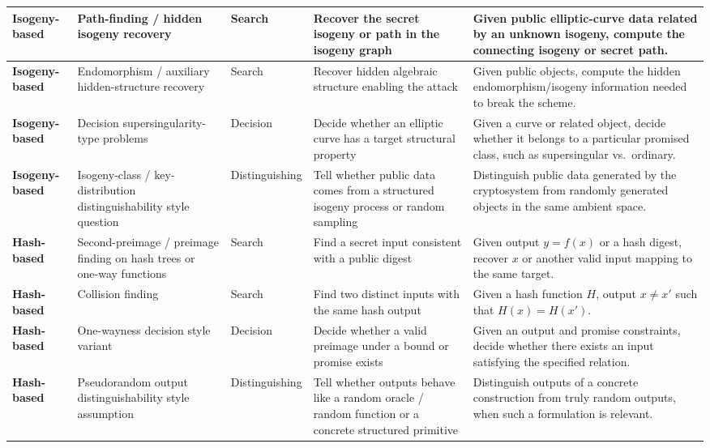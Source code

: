 \documentclass[11pt]{article}
\begin{document}
\begin{center}
\begin{tabular}{|p{1.9cm}|p{2.9cm}|p{3.3cm}|p{4.4cm}|p{4.8cm}|}
			\textbf{Isogeny-based} 
			& Path-finding / hidden isogeny recovery 
			& Search 
			& Recover the secret isogeny or path in the isogeny graph 
			& Given public elliptic-curve data related by an unknown isogeny, compute the connecting isogeny or secret path. \\
			\hline
			
			\textbf{Isogeny-based} 
			& Endomorphism / auxiliary hidden-structure recovery 
			& Search 
			& Recover hidden algebraic structure enabling the attack 
			& Given public objects, compute the hidden endomorphism/isogeny information needed to break the scheme. \\
			\hline
			
			\textbf{Isogeny-based} 
			& Decision supersingularity-type problems 
			& Decision 
			& Decide whether an elliptic curve has a target structural property 
			& Given a curve or related object, decide whether it belongs to a particular promised class, such as supersingular vs.\ ordinary. \\
			\hline
			
			\textbf{Isogeny-based} 
			& Isogeny-class / key-distribution distinguishability style question 
			& Distinguishing 
			& Tell whether public data comes from a structured isogeny process or random sampling 
			& Distinguish public data generated by the cryptosystem from randomly generated objects in the same ambient space. \\
			\hline
			
			\textbf{Hash-based} 
			& Second-preimage / preimage finding on hash trees or one-way functions 
			& Search 
			& Find a secret input consistent with a public digest 
			& Given output $y=f(x)$ or a hash digest, recover $x$ or another valid input mapping to the same target. \\
			\hline
			
			\textbf{Hash-based} 
			& Collision finding 
			& Search 
			& Find two distinct inputs with the same hash output 
			& Given a hash function $H$, output $x \neq x'$ such that $H(x)=H(x')$. \\
			\hline
			
			\textbf{Hash-based} 
			& One-wayness decision style variant 
			& Decision 
			& Decide whether a valid preimage under a bound or promise exists 
			& Given an output and promise constraints, decide whether there exists an input satisfying the specified relation. \\
			\hline
			
			\textbf{Hash-based} 
			& Pseudorandom output distinguishability style assumption 
			& Distinguishing 
			& Tell whether outputs behave like a random oracle / random function or a concrete structured primitive 
			& Distinguish outputs of a concrete construction from truly random outputs, when such a formulation is relevant. \\
			\hline
			
		\end{tabular}
	\end{center}
	\normalsize
	
\end{document}
